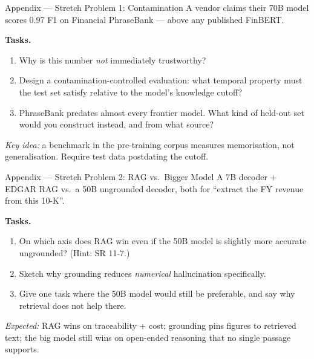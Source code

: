 \documentclass[9pt,t]{beamer}
\begin{document}

\begin{frame}[noframenumbering]{Appendix --- Stretch Problem 1: Contamination}
A vendor claims their 70B model scores 0.97 F1 on Financial PhraseBank --- above any
published FinBERT.

\medskip
\textbf{Tasks.}
\begin{enumerate}
  \item Why is this number \emph{not} immediately trustworthy?
  \item Design a contamination-controlled evaluation: what temporal property must the
        test set satisfy relative to the model's knowledge cutoff?
  \item PhraseBank predates almost every frontier model. What kind of held-out set
        would you construct instead, and from what source?
\end{enumerate}

\medskip
\footnotesize \textit{Key idea:} a benchmark in the pre-training corpus measures
memorisation, not generalisation. Require test data postdating the cutoff.
\end{frame}

\begin{frame}[noframenumbering]{Appendix --- Stretch Problem 2: RAG vs.\ Bigger Model}
A 7B decoder + EDGAR RAG vs.\ a 50B ungrounded decoder, both for ``extract the FY
revenue from this 10-K''.

\medskip
\textbf{Tasks.}
\begin{enumerate}
  \item On which axis does RAG win even if the 50B model is slightly more accurate
        ungrounded? (Hint: SR 11-7.)
  \item Sketch why grounding reduces \emph{numerical} hallucination specifically.
  \item Give one task where the 50B model would still be preferable, and say why
        retrieval does not help there.
\end{enumerate}

\medskip
\footnotesize \textit{Expected:} RAG wins on traceability + cost; grounding pins
figures to retrieved text; the big model still wins on open-ended reasoning that no
single passage supports.
\end{frame}
\end{document}

